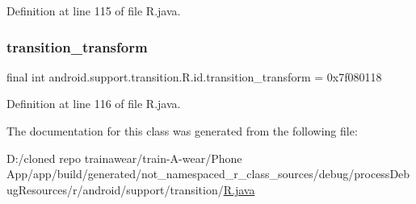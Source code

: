 Definition at line 115 of file R.\+java.

\mbox{\label{classandroid_1_1support_1_1transition_1_1_r_1_1id_a262eee6539d89b6200234e0c27e5d384}} 
\subsubsection{\texorpdfstring{transition\_transform}{transition\_transform}}
{\footnotesize\ttfamily final int android.\+support.\+transition.\+R.\+id.\+transition\+\_\+transform = 0x7f080118\hspace{0.3cm}{\ttfamily [static]}}



Definition at line 116 of file R.\+java.



The documentation for this class was generated from the following file\+:\begin{DoxyCompactItemize}
\item 
D\+:/cloned repo trainawear/train-\/\+A-\/wear/\+Phone App/app/build/generated/not\+\_\+namespaced\+\_\+r\+\_\+class\+\_\+sources/debug/process\+Debug\+Resources/r/android/support/transition/\mbox{\hyperlink{process_debug_resources_2r_2android_2support_2transition_2_r_8java}{R.\+java}}\end{DoxyCompactItemize}
